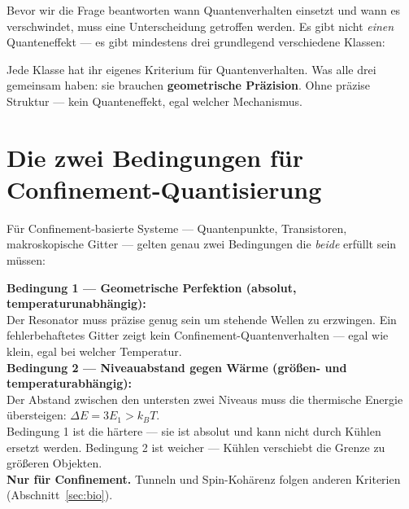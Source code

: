 Bevor wir die Frage beantworten wann Quantenverhalten
einsetzt und wann es verschwindet, muss eine Unterscheidung
getroffen werden. Es gibt nicht \emph{einen} Quanteneffekt ---
es gibt mindestens drei grundlegend verschiedene Klassen:

\begin{center}
\end{center}

Jede Klasse hat ihr eigenes Kriterium für Quantenverhalten.
Was alle drei gemeinsam haben: sie brauchen \textbf{geometrische
Präzision}. Ohne präzise Struktur --- kein Quanteneffekt,
egal welcher Mechanismus.

\section{Die zwei Bedingungen für Confinement-Quantisierung}
\label{sec:zwei-bedingungen}

Für Confinement-basierte Systeme --- Quantenpunkte, Transistoren,
makroskopische Gitter --- gelten genau zwei Bedingungen
die \emph{beide} erfüllt sein müssen:

\begin{important}
\textbf{Bedingung 1 --- Geometrische Perfektion (absolut, temperaturunabhängig):}\\
Der Resonator muss präzise genug sein um stehende Wellen zu erzwingen.
Ein fehlerbehaftetes Gitter zeigt kein Confinement-Quantenverhalten ---
egal wie klein, egal bei welcher Temperatur.\\[6pt]
\textbf{Bedingung 2 --- Niveauabstand gegen Wärme (größen- und temperaturabhängig):}\\
Der Abstand zwischen den untersten zwei Niveaus muss die
thermische Energie übersteigen: $\Delta E = 3E_1 > k_BT$.\\[6pt]
Bedingung 1 ist die härtere --- sie ist absolut und kann nicht
durch Kühlen ersetzt werden. Bedingung 2 ist weicher ---
Kühlen verschiebt die Grenze zu größeren Objekten.\\[4pt]
\textbf{Nur für Confinement.} Tunneln und Spin-Kohärenz
folgen anderen Kriterien (Abschnitt~\ref{sec:bio}).
\end{important}

